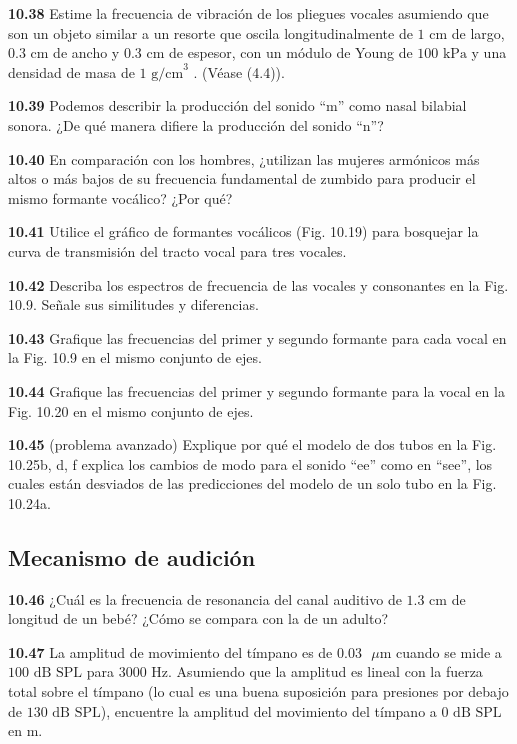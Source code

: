 \documentclass[12pt]{book}
\begin{document}
\noindent \textbf{10.38} Estime la frecuencia de vibración de los pliegues vocales asumiendo que son un objeto similar a un resorte que oscila longitudinalmente de $1\text{ cm}$ de largo, $0.3\text{ cm}$ de ancho y $0.3\text{ cm}$ de espesor, con un módulo de Young de $100\text{ kPa}$ y una densidad de masa de $1\text{ g/cm}^3$ \cite{1}. (Véase (4.4)).

\noindent \textbf{10.39} Podemos describir la producción del sonido ``m'' como nasal bilabial sonora. ¿De qué manera difiere la producción del sonido ``n''?

\noindent \textbf{10.40} En comparación con los hombres, ¿utilizan las mujeres armónicos más altos o más bajos de su frecuencia fundamental de zumbido para producir el mismo formante vocálico? ¿Por qué?

\noindent \textbf{10.41} Utilice el gráfico de formantes vocálicos (Fig. 10.19) para bosquejar la curva de transmisión del tracto vocal para tres vocales.

\noindent \textbf{10.42} Describa los espectros de frecuencia de las vocales y consonantes en la Fig. 10.9. Señale sus similitudes y diferencias.

\noindent \textbf{10.43} Grafique las frecuencias del primer y segundo formante para cada vocal en la Fig. 10.9 en el mismo conjunto de ejes.

\noindent \textbf{10.44} Grafique las frecuencias del primer y segundo formante para la vocal en la Fig. 10.20 en el mismo conjunto de ejes.

\noindent \textbf{10.45} (problema avanzado) Explique por qué el modelo de dos tubos en la Fig. 10.25b, d, f explica los cambios de modo para el sonido ``ee'' como en ``see'', los cuales están desviados de las predicciones del modelo de un solo tubo en la Fig. 10.24a.

\subsection*{Mecanismo de audición}

\noindent \textbf{10.46} ¿Cuál es la frecuencia de resonancia del canal auditivo de $1.3\text{ cm}$ de longitud de un bebé? ¿Cómo se compara con la de un adulto?

\noindent \textbf{10.47} La amplitud de movimiento del tímpano es de $0.03\text{ }\mu\text{m}$ cuando se mide a $100\text{ dB SPL}$ para $3000\text{ Hz}$. Asumiendo que la amplitud es lineal con la fuerza total sobre el tímpano (lo cual es una buena suposición para presiones por debajo de $130\text{ dB SPL}$), encuentre la amplitud del movimiento del tímpano a $0\text{ dB SPL}$ en $\text{m}$.
\end{document}
